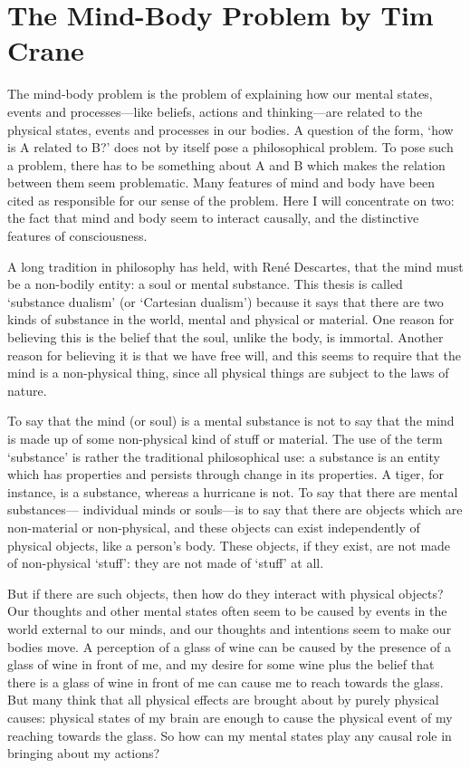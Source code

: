 \chapter{The Mind-Body Problem by Tim Crane}\autocite{Crane1}
\label{mindbodyprob}
The mind-body problem is the problem of explaining how our mental states, events
and processes—like beliefs, actions and thinking—are related to the physical states,
events and processes in our bodies. A question of the form, ‘how is A related to B?’
does not by itself pose a philosophical problem. To pose such a problem, there has to
be something about A and B which makes the relation between them seem
problematic. Many features of mind and body have been cited as responsible for our
sense of the problem. Here I will concentrate on two: the fact that mind and body
seem to interact causally, and the distinctive features of consciousness.

A long tradition in philosophy has held, with René Descartes, that the mind
must be a non-bodily entity: a soul or mental substance. This thesis is called
‘substance dualism’ (or ‘Cartesian dualism’) because it says that there are two kinds
of substance in the world, mental and physical or material. One reason for believing
this is the belief that the soul, unlike the body, is immortal. Another reason for
believing it is that we have free will, and this seems to require that the mind is a
non-physical thing, since all physical things are subject to the laws of nature.

To say that the mind (or soul) is a mental substance is not to say that the mind is
made up of some non-physical kind of stuff or material. The use of the term
‘substance’ is rather the traditional philosophical use: a substance is an entity which
has properties and persists through change in its properties. A tiger, for instance, is a
substance, whereas a hurricane is not. To say that there are mental substances—
individual minds or souls—is to say that there are objects which are non-material or
non-physical, and these objects can exist independently of physical objects, like a
person’s body. These objects, if they exist, are not made of non-physical ‘stuff’: they
are not made of ‘stuff’ at all.

But if there are such objects, then how do they interact with physical objects?
Our thoughts and other mental states often seem to be caused by events in the world
external to our minds, and our thoughts and intentions seem to make our bodies
move. A perception of a glass of wine can be caused by the presence of a glass of
wine in front of me, and my desire for some wine plus the belief that there is a glass
of wine in front of me can cause me to reach towards the glass. But many think that
all physical effects are brought about by purely physical causes: physical states of
my brain are enough to cause the physical event of my reaching towards the glass.
So how can my mental states play any causal role in bringing about my actions?

